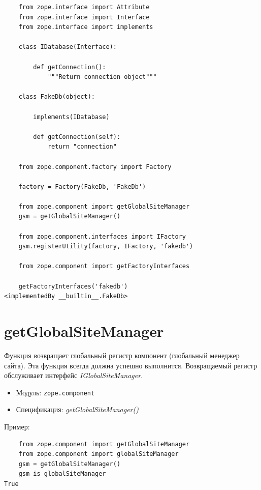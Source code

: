 \documentclass[a4paper,openany,twoside,draft]{book}
\providecommand*{\DUroletitlereference}[1]{\textsl{#1}}
\begin{document}
\begin{verbatim}
    from zope.interface import Attribute
    from zope.interface import Interface
    from zope.interface import implements

    class IDatabase(Interface):

        def getConnection():
            """Return connection object"""

    class FakeDb(object):

        implements(IDatabase)

        def getConnection(self):
            return "connection"

    from zope.component.factory import Factory

    factory = Factory(FakeDb, 'FakeDb')

    from zope.component import getGlobalSiteManager
    gsm = getGlobalSiteManager()

    from zope.component.interfaces import IFactory
    gsm.registerUtility(factory, IFactory, 'fakedb')

    from zope.component import getFactoryInterfaces

    getFactoryInterfaces('fakedb')
<implementedBy __builtin__.FakeDb>
\end{verbatim}


\section*{getGlobalSiteManager%
  \label{getglobalsitemanager}%
}

Функция возвращает глобальный регистр компонент (глобальный менеджер сайта).  Эта функция всегда должна успешно выполнится.  Возвращаемый регистр обслуживает интерфейс \DUroletitlereference{IGlobalSiteManager}.

\begin{itemize}

\item Модуль: \texttt{zope.component}

\item Спецификация: \DUroletitlereference{getGlobalSiteManager()}

\end{itemize}

Пример:

\begin{verbatim}
    from zope.component import getGlobalSiteManager
    from zope.component import globalSiteManager
    gsm = getGlobalSiteManager()
    gsm is globalSiteManager
True
\end{verbatim}
\end{document}
